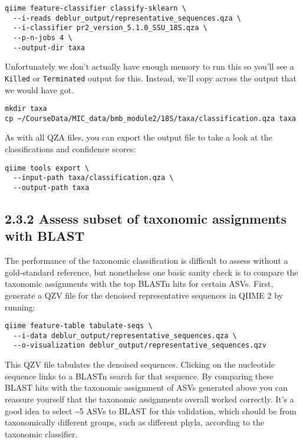 \documentclass[
]{book}
\begin{document}
\begin{verbatim}
qiime feature-classifier classify-sklearn \
  --i-reads deblur_output/representative_sequences.qza \
  --i-classifier pr2_version_5.1.0_SSU_18S.qza \
  --p-n-jobs 4 \
  --output-dir taxa
\end{verbatim}

Unfortunately we don't actually have enough memory to run this so you'll see a \texttt{Killed} or \texttt{Terminated} output for this.
Instead, we'll copy across the output that we would have got.

\begin{verbatim}
mkdir taxa      
cp ~/CourseData/MIC_data/bmb_module2/18S/taxa/classification.qza taxa
\end{verbatim}

As with all QZA files, you can export the output file to take a look at the classifications and confidence scores:

\begin{verbatim}
qiime tools export \
  --input-path taxa/classification.qza \
  --output-path taxa
\end{verbatim}

\subsection{2.3.2 Assess subset of taxonomic assignments with BLAST}\label{assess-subset-of-taxonomic-assignments-with-blast-1}

The performance of the taxonomic classification is difficult to assess without a gold-standard reference, but nonetheless one basic sanity check is to compare the taxonomic assignments with the top BLASTn hits for certain ASVs. First, generate a QZV file for the denoised representative sequences in QIIME 2 by running:

\begin{verbatim}
qiime feature-table tabulate-seqs \
  --i-data deblur_output/representative_sequences.qza \
  --o-visualization deblur_output/representative_sequences.qzv
\end{verbatim}

This QZV file tabulates the denoised sequences. Clicking on the nucleotide sequence links to a BLASTn search for that sequence. By comparing these BLAST hits with the taxonomic assignment of ASVs generated above you can reassure yourself that the taxonomic assignments overall worked correctly. It's a good idea to select \textasciitilde5 ASVs to BLAST for this validation, which should be from taxonomically different groups, such as different phyla, according to the taxonomic classifier.
\end{document}
